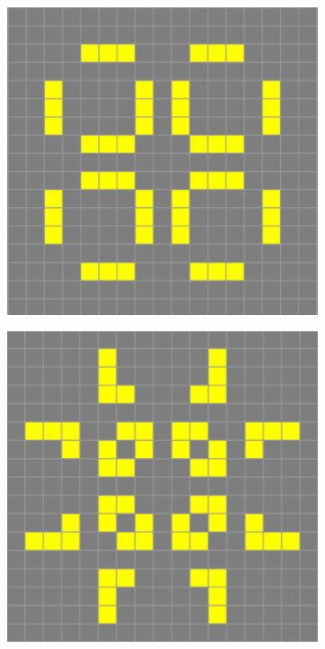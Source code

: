 \begin{figure}[h]
    \centering
    \begin{subfigure}{0.3\textwidth}
        \includegraphics[width=\textwidth]{images/life-pulsar-1.png}
    \end{subfigure}
    \begin{subfigure}{0.3\textwidth}
        \includegraphics[width=\textwidth]{images/life-pulsar-2.png}

\end{subfigure}
\end{figure}
